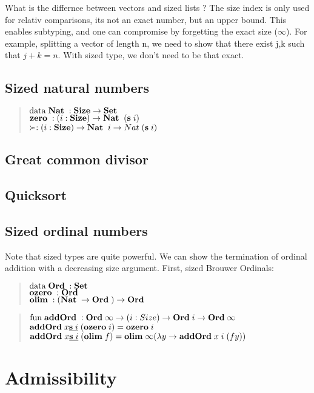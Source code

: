 What is the differnce between vectors and sized lists ?
The size index is only used for relativ comparisons, its not an exact number, but an upper bound.
This enables subtyping, and one can compromise by forgetting the exact size ($\infty$).
For example, splitting a vector of length n, we need to show that there exist j,k such that $j+k = n$.
With sized type, we don't need to be that exact.
\subsection{Sized natural numbers}
\begin{quote}
$\mathrm{data}\; \mathbf{Nat}\; : \mathbf{Size} \rightarrow \mathbf{Set} $ 
\\
$\mathbf{zero}\; : ( i : \mathbf{Size} ) \rightarrow  \mathbf{Nat}\; \; (\mathbf{s}\; i) $
\\
$\succ : ( i : \mathbf{Size} ) \rightarrow  \mathbf{Nat}\; \; i \rightarrow Nat \; (\mathbf{s}\; i) $
\end{quote}

\subsection{Great common divisor}

\subsection{Quicksort}

\subsection{Sized ordinal numbers}
Note that sized types are quite powerful. 
We can show the termination of ordinal addition with a decreasing size argument.
First, sized Brouwer Ordinals:
\begin{quote}
$\mathrm{data}\; \mathbf{Ord}\; : \mathbf{Set}$ 
\\
$\mathbf{ozero}\; : \mathbf{Ord}\; $
\\
$\mathbf{olim}\; : (\mathbf{Nat}\; \rightarrow \mathbf{Ord}\; ) \rightarrow \mathbf{Ord}\; $
\end{quote}
\begin{quote}
$\mathrm{fun}\; \mathbf{addOrd}\; : \mathbf{Ord}\; \infty \rightarrow ( i : Size ) \rightarrow \mathbf{Ord}\; i \rightarrow \mathbf{Ord}\; \infty$
\\
$\mathbf{addOrd}\; x \underline{\mathbf{s}\; i}\; (\mathbf{ozero}\; i) = \mathbf{ozero}\; i $
\\
$\mathbf{addOrd}\; x \underline{\mathbf{s}\; i}\; (\mathbf{olim}\; f)  = \mathbf{olim}\; \infty ( \lambda y \rightarrow \mathbf{addOrd}\;  x \; i \; (f y))  $
\end{quote}

\section{Admissibility}
